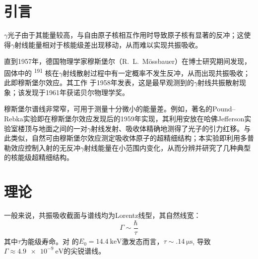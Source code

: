 \documentclass[aps,pre,12pt,preprint,%
	onecolumn,showpacs,showkeys,nofootinbib]{revtex4-1}
\newcommand{\FeAtom}{\textsuperscript{\tup{57}}\tup{Fe}}
\begin{document}
\section{引言}
\vspace{-1ex}
	$\gamma$光子由于其能量较高，与自由原子核相互作用时导致原子核有显著的反冲；这使得$\gamma$射线能量相对于核能级差出现移动，从而难以实现共振吸收。
	
	直到1957年，德国物理学家穆斯堡尔（R.~L.~Mössbauer）在博士研究期间发现，
	固体中的 \textsuperscript{191} 核在$\gamma$射线散射过程中有一定概率不发生反冲，从而出现共振吸收；此即穆斯堡尔效应。其工作 \cite{mossbauer1958kernresonanzfluoreszenz} 于1958年发表，这是最早观测到的$\gamma$射线共振散射现象；该发现于1961年获诺贝尔物理学奖。
	
	穆斯堡尔谱线非常窄，可用于测量十分微小的能量差。例如，著名的Pound–Rebka实验即在穆斯堡尔效应发现后的1959年实现，其利用安放在哈佛Jefferson实验室楼顶与地面之间的一对$\gamma$射线发射、吸收体精确地测得了光子的引力红移\supercite{pound1959gravitational}。与此类似，自然可由穆斯堡尔效应测定吸收体原子的超精细结构；本实验即利用多普勒效应控制入射的无反冲$\gamma$射线能量在小范围内变化，从而分辨并研究了几种典型的核能级超精细结构。
\vspace{-2ex}
\section{理论}
\vspace{-1ex}
\setlength{\jot}{0pt}
	一般来说，共振吸收截面与谱线均为Lorentz线型，其自然线宽：
	\begin{equation}
		\Gamma \sim \frac{\hbar}{\tau}
	\end{equation}
	其中$\tau$为能级寿命。对 \FeAtom 的$E_0 = \SI{14.4}{\keV}$激发态而言，$\tau\sim\SI{.14}{\us}$, 导致$\Gamma\approx\SI{4.9e-9}{\eV}$的尖锐谱线。
	
\end{document}
